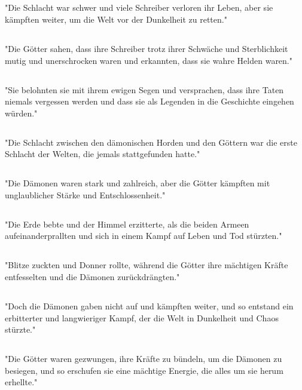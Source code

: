 \documentclass{article}
\begin{document}
\subsection{}
"Die Schlacht war schwer und viele Schreiber verloren ihr Leben, aber sie kämpften weiter, um die Welt vor der Dunkelheit zu retten."
\subsection{}
"Die Götter sahen, dass ihre Schreiber trotz ihrer Schwäche und Sterblichkeit mutig und unerschrocken waren und erkannten, dass sie wahre Helden waren."
\subsection{}
"Sie belohnten sie mit ihrem ewigen Segen und versprachen, dass ihre Taten niemals vergessen werden und dass sie als Legenden in die Geschichte eingehen würden."
\subsection{}
"Die Schlacht zwischen den dämonischen Horden und den Göttern war die erste Schlacht der Welten, die jemals stattgefunden hatte."
\subsection{}
"Die Dämonen waren stark und zahlreich, aber die Götter kämpften mit unglaublicher Stärke und Entschlossenheit."
\subsection{}
"Die Erde bebte und der Himmel erzitterte, als die beiden Armeen aufeinanderprallten und sich in einem Kampf auf Leben und Tod stürzten."
\subsection{}
"Blitze zuckten und Donner rollte, während die Götter ihre mächtigen Kräfte entfesselten und die Dämonen zurückdrängten."
\subsection{}
"Doch die Dämonen gaben nicht auf und kämpften weiter, und so entstand ein erbitterter und langwieriger Kampf, der die Welt in Dunkelheit und Chaos stürzte."
\subsection{}
"Die Götter waren gezwungen, ihre Kräfte zu bündeln, um die Dämonen zu besiegen, und so erschufen sie eine mächtige Energie, die alles um sie herum erhellte."
\end{document}
